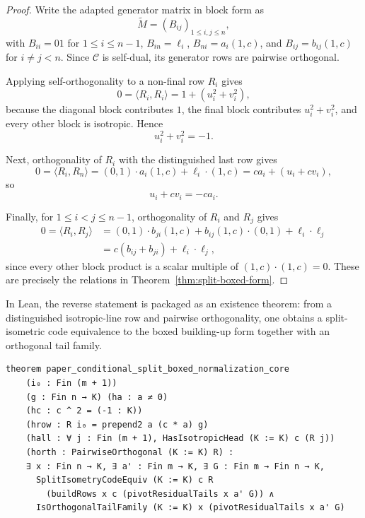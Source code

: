 \documentclass[12pt]{article}
\begin{document}
\begin{proof}
Write the adapted generator matrix in block form as
\[
\widetilde M=(B_{ij})_{1\le i,j\le n},
\]
with \(B_{ii}=01\) for \(1\le i\le n-1\), \(B_{in}=\ell_i\), \(B_{ni}=a_i(1,c)\), and \(B_{ij}=b_{ij}(1,c)\) for \(i\neq j<n\). Since \(\mathcal C\) is self-dual, its generator rows are pairwise orthogonal.

Applying self-orthogonality to a non-final row \(R_i\) gives
\[
0=\langle R_i,R_i\rangle
=
1+(u_i^2+v_i^2),
\]
because the diagonal block contributes \(1\), the final block contributes \(u_i^2+v_i^2\), and every other block is isotropic. Hence
\[
u_i^2+v_i^2=-1.
\]

Next, orthogonality of \(R_i\) with the distinguished last row gives
\[
0=\langle R_i,R_n\rangle
=
(0,1)\cdot a_i(1,c)+\ell_i\cdot(1,c)
=
c a_i+(u_i+c v_i),
\]
so
\[
u_i+c v_i=-c a_i.
\]

Finally, for \(1\le i<j\le n-1\), orthogonality of \(R_i\) and \(R_j\)
gives
\[
\begin{aligned}
0=\langle R_i,R_j\rangle
&=(0,1)\cdot b_{ji}(1,c)
  +b_{ij}(1,c)\cdot(0,1)+\ell_i\cdot\ell_j\\
&=c(b_{ij}+b_{ji})+\ell_i\cdot\ell_j,
\end{aligned}
\]
since every other block product is a scalar multiple of
\((1,c)\cdot(1,c)=0\).  These are precisely the relations in
Theorem~\ref{thm:split-boxed-form}.
\end{proof}

\noindent
In Lean, the reverse statement is packaged as an existence theorem: from a distinguished isotropic-line row and pairwise orthogonality, one obtains a split-isometric code equivalence to the boxed building-up form together with an orthogonal tail family.

\begin{lstlisting}[caption={Lean for Theorem~\ref{thm:conditional-split-boxed-normalization}.}]
theorem paper_conditional_split_boxed_normalization_core
    (i₀ : Fin (m + 1))
    (g : Fin n → K) (ha : a ≠ 0)
    (hc : c ^ 2 = (-1 : K))
    (hrow : R i₀ = prepend2 a (c * a) g)
    (hall : ∀ j : Fin (m + 1), HasIsotropicHead (K := K) c (R j))
    (horth : PairwiseOrthogonal (K := K) R) :
    ∃ x : Fin n → K, ∃ a' : Fin m → K, ∃ G : Fin m → Fin n → K,
      SplitIsometryCodeEquiv (K := K) c R
        (buildRows x c (pivotResidualTails x a' G)) ∧
      IsOrthogonalTailFamily (K := K) x (pivotResidualTails x a' G)
\end{lstlisting}
\end{document}
